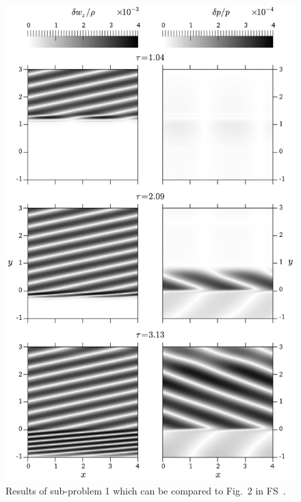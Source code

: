 \begin {figure}
\centering
\includegraphics[width=12cm]{figures/TP1}
\caption {Results of sub-problem 1 which can be compared to Fig.~2 in FS~\cite{Sato2009}.}
\label{fig:TP1}
\end{figure}

